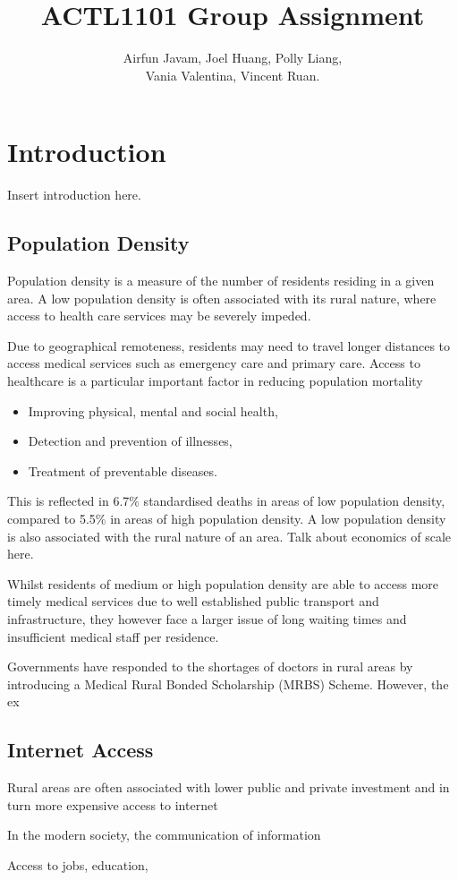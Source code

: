 \documentclass[12pt,a4paper,oneside,reqno]{article}
\title{ACTL1101 Group Assignment}
\author{Airfun Javam, Joel Huang, Polly Liang,\\ Vania Valentina, Vincent Ruan.}
\date{}
\begin{document}
	\maketitle
	\section{Introduction}
	Insert introduction here.
	\subsection{Population Density}
	Population density is a measure of the number of residents residing in a given area. A low population density is often associated with its rural nature, where access to health care services may be severely impeded. 
	
	Due to geographical remoteness, residents may need to travel longer distances to access medical services such as emergency care and primary care. Access to healthcare is a particular important factor in reducing population mortality
	\begin{itemize}
		\item Improving physical, mental and social health,
		\item Detection and prevention of illnesses,
		\item Treatment of preventable diseases.
	\end{itemize}

	This is reflected in 6.7\% standardised deaths in areas of low population density, compared to 5.5\% in areas of high population density. A low population density is also associated with the rural nature of an area. Talk about economics of scale here.
	
	Whilst residents of medium or high population density are able to access more timely medical services due to well established public transport and infrastructure, they however face a larger issue of long waiting times and insufficient medical staff per residence.
	
	Governments have responded to the shortages of doctors in rural areas by introducing a Medical Rural Bonded Scholarship (MRBS) Scheme. However, the ex
	\subsection{Internet Access}
	Rural areas are often associated with lower public and private investment and in turn more expensive access to internet
	
	In the modern society, the communication of information 
	
	Access to jobs, education,
\end{document}
